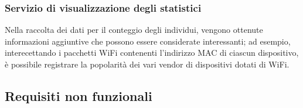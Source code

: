 \subsubsection{Servizio di visualizzazione degli statistici}

Nella raccolta dei dati per il conteggio degli individui, vengono ottenute informazioni aggiuntive che possono essere considerate interessanti;
ad esempio, interecettando i pacchetti WiFi contenenti l'indirizzo MAC di ciascun dispositivo, è possibile registrare la popolarità dei vari vendor di dispositivi dotati di WiFi.

\subsection{Requisiti non funzionali}


